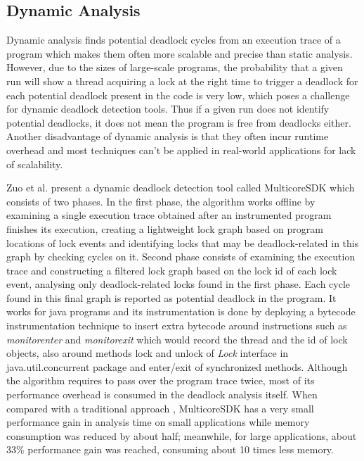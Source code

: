\subsection{Dynamic Analysis}

Dynamic analysis finds potential deadlock cycles from an execution trace of a program which makes them often more scalable and precise than static analysis.
However, due to the sizes of large-scale programs, the probability that a given run will show a thread acquiring a lock at the right time to trigger a deadlock for
each potential deadlock present in the code is very low, which poses a challenge for dynamic deadlock detection tools. Thus if a given run does not identify potential
deadlocks, it does not mean the program is free from deadlocks either. Another disadvantage of dynamic analysis is that they often incur runtime overhead and most techniques
can't be applied in real-world applications for lack of scalability.

Zuo et al. \cite{mcsdk} present a dynamic deadlock detection tool called MulticoreSDK which consists of two phases.
In the first phase, the algorithm works offline by examining a single execution trace obtained after an instrumented program finishes its execution,
creating a lightweight lock graph based on program locations of lock events and identifying locks that may be deadlock-related in this graph by checking cycles on it.
Second phase consists of examining the execution trace and constructing a filtered lock graph based on the lock id of each lock event, analysing only deadlock-related locks
found in the first phase. Each cycle found in this final graph is reported as potential deadlock in the program.
It works for java programs and its instrumentation is done by deploying a bytecode instrumentation technique \cite{tanter} to insert extra bytecode
around instructions such as \emph{monitorenter} and \emph{monitorexit} which would record the thread and the id of lock objects, also around methods lock and unlock of
\emph{Lock} interface in java.util.concurrent package and enter/exit of synchronized methods.
Although the algorithm requires to pass over the program trace twice, most of its performance overhead is consumed in the deadlock analysis itself.
When compared with a traditional approach \cite{contest}, MulticoreSDK has a very small performance gain in analysis time on small applications while memory consumption
was reduced by about half; meanwhile, for large applications, about 33\% performance gain was reached, consuming about 10 times less memory.

